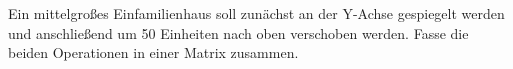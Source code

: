 \documentclass[../../main.tex]{subfiles}
\begin{document}
Ein mittelgroßes Einfamilienhaus soll zunächst an der Y-Achse gespiegelt werden und anschließend um 50 Einheiten nach oben verschoben werden. Fasse die beiden Operationen in einer Matrix zusammen.
\end{document}
